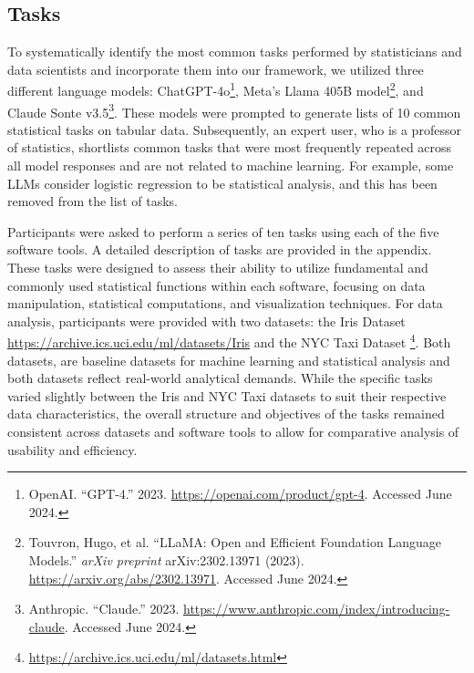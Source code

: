 \documentclass{article}
\begin{document}
\subsection{Tasks}
To systematically identify the most common tasks performed by statisticians and data scientists and incorporate them into our framework, we utilized three different language models: ChatGPT-4o\footnote{OpenAI. “GPT-4.” 2023. \url{https://openai.com/product/gpt-4}. Accessed June 2024.}, 
Meta's Llama 405B model\footnote{Touvron, Hugo, et al. “LLaMA: Open and Efficient Foundation Language Models.” 
\textit{arXiv preprint} arXiv:2302.13971 (2023). \url{https://arxiv.org/abs/2302.13971}. Accessed June 2024.}, 
and Claude Sonte v3.5\footnote{Anthropic. “Claude.” 2023. \url{https://www.anthropic.com/index/introducing-claude}. Accessed June 2024.}. These models were prompted to generate lists of 10 common statistical tasks on tabular data. Subsequently, an expert user, who is a professor of statistics, shortlists common tasks that were most frequently repeated across all model responses and are not related to machine learning. For example, some LLMs consider logistic regression to be statistical analysis, and this has been removed from the list of tasks. 

Participants were asked to perform a series of ten tasks using each of the five software tools. A detailed description of tasks are provided in the appendix. These tasks were designed to assess their ability to utilize fundamental and commonly used statistical functions within each software, focusing on data manipulation, statistical computations, and visualization techniques. 
For data analysis, participants were provided with two datasets: the Iris Dataset  \url{https://archive.ics.uci.edu/ml/datasets/Iris} and the NYC Taxi Dataset \footnote{ \url{https://archive.ics.uci.edu/ml/datasets.html}}. Both datasets, are baseline datasets for machine learning and statistical analysis and both datasets reflect real-world analytical demands.
While the specific tasks varied slightly between the Iris and NYC Taxi datasets to suit their respective data characteristics, the overall structure and objectives of the tasks remained consistent across datasets and software tools to allow for comparative analysis of usability and efficiency.
\end{document}
